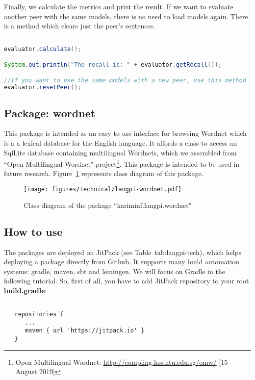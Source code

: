 Finally, we calculate the metrics and print the result. 
If we want to evaluate another peer with the same models, there is no need to load models again. 
There is a method which clears just the peer's sentences.

\begin{lstlisting}[language={Java}, style=codeStyle]

evaluator.calculate();

System.out.println("The recall is: " + evaluator.getRecall());

//If you want to use the same models with a new peer, use this method
evaluator.resetPeer();
\end{lstlisting}


\subsection{Package: wordnet}

This package is intended as an easy to use interface for browsing Wordnet \citep{95-miller} which is a a lexical database for the English language.
It affords a class to access an SqlLite database containing multilingual Wordnets, which we assembled from ``Open Multilingual Wordnet" project\footnote{Open Multilingual Wordnet: \url{http://compling.hss.ntu.edu.sg/omw/} [15 August 2019]}.
This package is intended to be used in future research. 
Figure~\ref{fig:langpi-wordnet} represents class diagram of this package.

\begin{figure}[!ht]
	\begin{center}
		\texttt{[image: figures/technical/langpi-wordnet.pdf]}
	\end{center}
	\caption{\label{fig:langpi-wordnet} Class diagram of the package ``kariminf.langpi.wordnet"}
\end{figure}

\subsection{How to use}

The packages are deployed on JitPack (see Table~{tab:langpi-tech}), which helps deploying a package directly from Github. 
It supports many build automation systems: gradle, maven, sbt and leiningen. 
We will focus on Gradle in the following tutorial. 
So, first of all, you have to add JitPack repository to your root \textbf{build.gradle}:

\begin{lstlisting}[style=codeStyle] %language={[KB]Javascript}, 

   repositories {
      ...
      maven { url 'https://jitpack.io' }
   }
\end{lstlisting}

